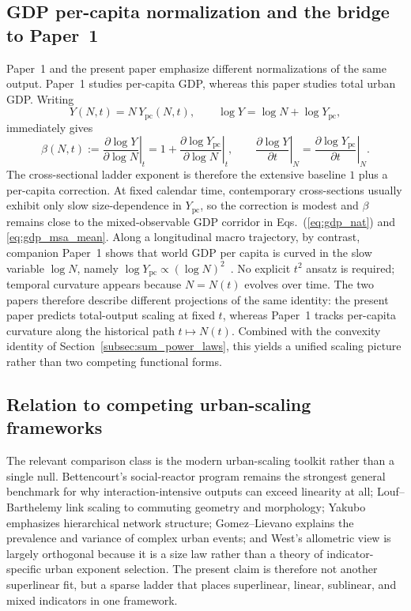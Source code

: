 \subsection{GDP per-capita normalization and the bridge to Paper~1}\label{subsec:GDP_normalization_bridge}
Paper~1 and the present paper emphasize different normalizations of the same output. Paper~1 studies per-capita GDP, whereas this paper studies total urban GDP. Writing
\begin{equation}
Y(N,t)=N\,Y_{\mathrm{pc}}(N,t),\qquad\log Y=\log N+\log Y_{\mathrm{pc}},
\label{eq:GDP_decomposition}
\end{equation}
immediately gives
\begin{equation}
\beta(N,t):=\left.\frac{\partial \log Y}{\partial \log N}\right|_{t}=1+\left.\frac{\partial \log Y_{\mathrm{pc}}}{\partial \log N}\right|_{t},\qquad\left.\frac{\partial \log Y}{\partial t}\right|_{N}=\left.\frac{\partial \log Y_{\mathrm{pc}}}{\partial t}\right|_{N}.
\label{eq:per_capita_link}
\end{equation}
The cross-sectional ladder exponent is therefore the extensive baseline \(1\) plus a per-capita correction. At fixed calendar time, contemporary cross-sections usually exhibit only slow size-dependence in \(Y_{\mathrm{pc}}\), so the correction is modest and \(\beta\) remains close to the mixed-observable GDP corridor in Eqs.~(\ref{eq:gdp_nat}) and \eqref{eq:gdp_msa_mean}. Along a longitudinal macro trajectory, by contrast, companion Paper~1 shows that world GDP per capita is curved in the slow variable \(\log N\), namely \(\log Y_{\mathrm{pc}}\propto (\log N)^2\)~\cite{Kato2026a}. No explicit \(t^2\) ansatz is required; temporal curvature appears because \(N=N(t)\) evolves over time. The two papers therefore describe different projections of the same identity: the present paper predicts total-output scaling at fixed \(t\), whereas Paper~1 tracks per-capita curvature along the historical path \(t\mapsto N(t)\). Combined with the convexity identity of Section~\ref{subsec:sum_power_laws}, this yields a unified scaling picture rather than two competing functional forms.

\subsection{Relation to competing urban-scaling frameworks}
The relevant comparison class is the modern urban-scaling toolkit rather than a
single null. Bettencourt's social-reactor program remains the strongest general
benchmark for why interaction-intensive outputs can exceed linearity at all;
Louf--Barthelemy link scaling to commuting geometry and morphology;
Yakubo emphasizes hierarchical network structure; Gomez--Lievano explains the
prevalence and variance of complex urban events; and West's allometric view is
largely orthogonal because it is a size law rather than a theory of
indicator-specific urban exponent selection. The present claim is therefore not
another superlinear fit, but a sparse ladder that places superlinear, linear,
sublinear, and mixed indicators in one framework.

